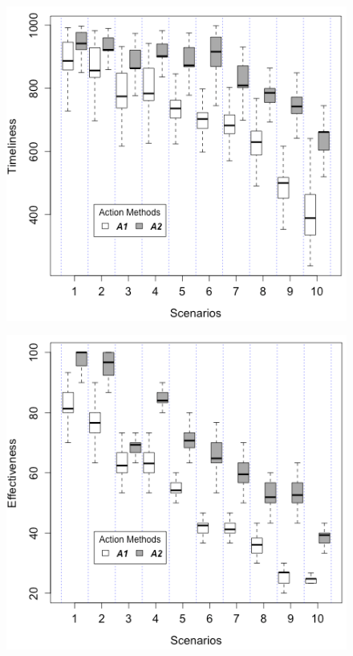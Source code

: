 \begin{figure}
\centering
\begin{minipage}{.5\textwidth}
  \centering
  \includegraphics[width=0.95\linewidth]{figures/graphs/Boxplot_M3.png}
  \label{fig:m2}
\end{minipage}%
\begin{minipage}{.5\textwidth}
  \centering
  \includegraphics[width=0.95\linewidth]{figures/graphs/Boxplot_M5.png}
  \label{fig:m3}
\end{minipage}
\end{figure}


